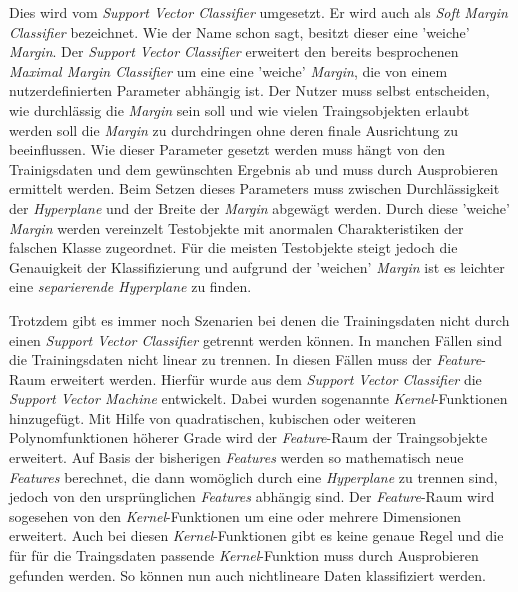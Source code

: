 Dies wird vom \textit{Support Vector Classifier} umgesetzt. Er wird auch als \textit{Soft Margin Classifier} bezeichnet.
Wie der Name schon sagt, besitzt dieser eine 'weiche' \textit{Margin}. 
Der \textit{Support Vector Classifier} erweitert den bereits besprochenen \textit{Maximal Margin Classifier}
um eine eine 'weiche' \textit{Margin}, die von einem nutzerdefinierten Parameter abhängig ist.
Der Nutzer muss selbst entscheiden, wie durchlässig die \textit{Margin} sein soll und
wie vielen Traingsobjekten erlaubt werden soll die \textit{Margin} zu durchdringen ohne deren finale Ausrichtung zu beeinflussen.
Wie dieser Parameter gesetzt werden muss hängt von den Trainigsdaten und dem gewünschten Ergebnis ab
und muss durch Ausprobieren ermittelt werden.
Beim Setzen dieses Parameters muss zwischen Durchlässigkeit der \textit{Hyperplane} und der Breite der \textit{Margin} abgewägt werden.
Durch diese 'weiche' \textit{Margin} werden vereinzelt Testobjekte mit anormalen Charakteristiken der falschen Klasse
zugeordnet. Für die meisten Testobjekte steigt jedoch die Genauigkeit der Klassifizierung und aufgrund der 'weichen' \textit{Margin}
ist es leichter eine \textit{separierende Hyperplane} zu finden.\cite[S. 1566]{noble_2006}

Trotzdem gibt es immer noch Szenarien bei denen die Trainingsdaten nicht durch einen \textit{Support Vector Classifier} getrennt
werden können. In manchen Fällen sind die Trainingsdaten nicht linear zu trennen.
In diesen Fällen muss der \textit{Feature}-Raum erweitert werden. Hierfür wurde aus dem \textit{Support Vector Classifier}
die \textit{Support Vector Machine} entwickelt. Dabei wurden sogenannte \textit{Kernel}-Funktionen hinzugefügt.
Mit Hilfe von quadratischen, kubischen oder weiteren Polynomfunktionen höherer Grade wird der \textit{Feature}-Raum der
Traingsobjekte erweitert. Auf Basis der bisherigen \textit{Features} werden so mathematisch neue \textit{Features} berechnet, die 
dann womöglich durch eine \textit{Hyperplane} zu trennen sind, jedoch von den ursprünglichen \textit{Features} abhängig sind.
Der \textit{Feature}-Raum wird sogesehen von den \textit{Kernel}-Funktionen um eine oder mehrere Dimensionen erweitert.
Auch bei diesen \textit{Kernel}-Funktionen gibt es keine genaue Regel und die für für die Traingsdaten passende 
\textit{Kernel}-Funktion muss durch Ausprobieren gefunden werden. So können nun auch nichtlineare Daten klassifiziert werden.
\cite[S. 1566f.]{noble_2006}\cite[S. 224 - 227]{suthaharan_2015}


